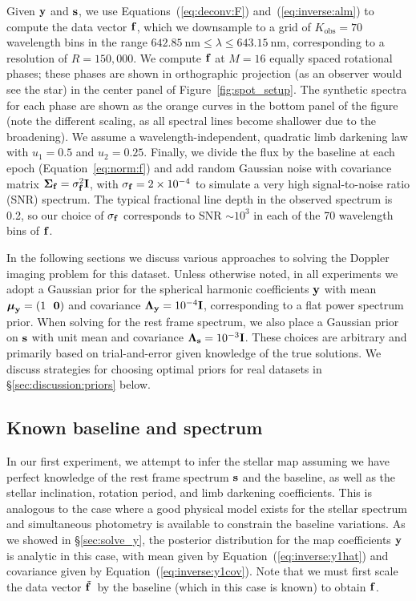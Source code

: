 \documentclass[modern]{aastex631}
\begin{document}
Given ${\mathbf{y}}$ and ${\mathbf{s}}$, we use Equations~(\ref{eq:deconv:F}) and~(\ref{eq:inverse:alm}) to compute the data vector ${\mathbf{f}}$, which we downsample to a grid of 
%
$K_\mathrm{obs} = 70$ 
%
wavelength bins in the range $642.85~\mathrm{nm} \leq \lambda \leq 643.15~\mathrm{nm}$, corresponding to a resolution of
%
$R = 150,000$.
%
We compute ${\mathbf{f}}$ at $M = 16$ equally spaced rotational phases; these phases are shown in orthographic projection (as an observer would see the star) in the center panel of Figure~\ref{fig:spot_setup}. 
The synthetic spectra for each phase are shown as the orange curves in the bottom panel of the figure (note the different scaling, as all spectral lines become shallower due to the broadening). 
%
We assume a wavelength-independent, quadratic limb darkening law with $u_1 = 0.5$ and $u_2 = 0.25$. 
Finally, we divide the flux by the baseline at each epoch (Equation~\ref{eq:norm:f}) and add random Gaussian noise with covariance matrix $\boldsymbol{\Sigma}_{\mathbf{f}} = \sigma_{\mathbf{f}}^2 \mathbf{I}$, with $\sigma_{\mathbf{f}} = 2\times 10^{-4}$ to simulate a very high signal-to-noise ratio (SNR) spectrum. 
The typical fractional line depth in the observed spectrum is 0.2, so our choice of $\sigma_{\mathbf{f}}$ corresponds to SNR $\sim 10^{3}$ in each of the 70 wavelength bins of ${\mathbf{f}}$.

In the following sections we discuss various approaches to solving the Doppler imaging problem for this dataset.
Unless otherwise noted, in all experiments we adopt a Gaussian prior for the spherical harmonic coefficients ${\mathbf{y}}$ with mean $\boldsymbol{\mu}_\bvec{y} = \left(1 \quad\quad \bvec{0}\right)$ and covariance $\boldsymbol{\Lambda}_{\mathbf{y}} = 10^{-4} {\mathbf{I}}$, corresponding to a flat power spectrum prior.
When solving for the rest frame spectrum, we also place a Gaussian prior on ${\mathbf{s}}$ with unit mean and covariance $\boldsymbol{\Lambda}_{\mathbf{s}} = 10^{-3}{\mathbf{I}}$.
These choices are arbitrary and primarily based on trial-and-error given knowledge of the true solutions.
We discuss strategies for choosing optimal priors for real datasets in \S\ref{sec:discussion:priors} below.

\subsection{Known baseline and spectrum}
\label{sec:spot_y1}
%
In our first experiment, we attempt to infer the stellar map assuming we have perfect knowledge of the rest frame spectrum ${\mathbf{s}}$ and the baseline, as well as the stellar inclination, rotation period, and limb darkening coefficients.
This is analogous to the case where a good physical model exists for the stellar spectrum and simultaneous photometry is available to constrain the baseline variations.
As we showed in \S\ref{sec:solve_y}, the posterior distribution for the map coefficients ${\mathbf{y}}$ is analytic in this case, with mean given by Equation~(\ref{eq:inverse:y1hat}) and covariance given by Equation~(\ref{eq:inverse:y1cov}). 
Note that we must first scale the data vector $\tilde{{\mathbf{f}}\hspace{0.2em}}$ by the baseline (which in this case is known) to obtain ${\mathbf{f}}$.
\end{document}
